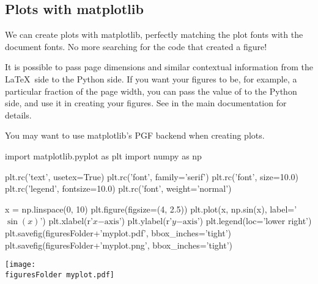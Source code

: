 \documentclass[11pt]{article}
\newcommand{\figuresFolder}{figures/}
\begin{document}
\subsection{Plots with matplotlib}

We can create plots with matplotlib, perfectly matching the plot fonts with the document fonts.  No more searching for the code that created a figure!

It is possible to pass page dimensions and similar contextual information from the \LaTeX\ side to the Python side.  If you want your figures to be, for example, a particular fraction of the page width, you can pass the value of  to the Python side, and use it in creating your figures.  See  in the main documentation for details.

You may want to use matplotlib's PGF backend when creating plots.

\begin{pyblock}
import matplotlib.pyplot as plt
import numpy as np

plt.rc('text', usetex=True)
plt.rc('font', family='serif')
plt.rc('font', size=10.0)
plt.rc('legend', fontsize=10.0)
plt.rc('font', weight='normal')

x = np.linspace(0, 10)
plt.figure(figsize=(4, 2.5))
plt.plot(x, np.sin(x), label='$\sin(x)$')
plt.xlabel(r'$x\mathrm{-axis}$')
plt.ylabel(r'$y\mathrm{-axis}$')
plt.legend(loc='lower right')
plt.savefig(figuresFolder+'myplot.pdf', bbox_inches='tight')
plt.savefig(figuresFolder+'myplot.png', bbox_inches='tight')
\end{pyblock}

\begin{center}
\texttt{[image: \\figuresFolder myplot.pdf]}
\end{center}
\end{document}
